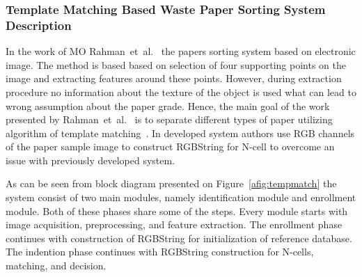 \documentclass{lutmscthesis}[2010/09/22]
\begin{document}
\subsubsection*{ Template Matching Based Waste Paper Sorting System Description }

In the work of MO Rahman~et~al.~\cite{Rahman2009sorting} the papers sorting
system based on electronic image. The method is based based on
selection of four supporting points on the image and extracting
features around these points. However, during extraction
procedure no information about the texture of the object
is used what can lead to wrong assumption about the paper
grade. Hence, the main goal of the work presented by
Rahman~et~al.~\cite{Rahman2009matching} is to separate different
types of paper utilizing algorithm of template
matching~\cite{Pham:2003}. In developed system authors
use RGB channels of the paper sample image to
construct RGBString for N-cell to overcome an issue
with previously developed system.

As can be seen from block diagram presented on Figure~\ref{afig:tempmatch}
the system consist of two main modules, namely identification module
and enrollment module. Both of these phases share some of the steps.
Every module starts with image acquisition, preprocessing,
and feature extraction. The enrollment phase continues with construction
of RGBString for initialization of reference database.
The indention phase continues with RGBString construction
for N-cells, matching, and decision.
\end{document}

